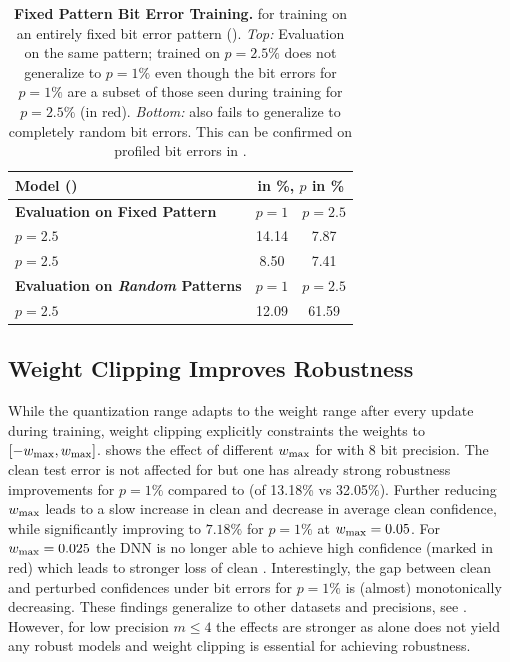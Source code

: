 \begin{table}[t]
	\centering
	\caption{\textbf{Fixed Pattern Bit Error Training.} \RTE for training on an entirely fixed bit error pattern (\Pattern). \emph{Top:} Evaluation on the same pattern; \Pattern trained on $p = 2.5\%$ does not generalize to $p = 1\%$ even though the bit errors for $p = 1\%$ are a subset of those seen during training for $p = 2.5\%$ (in {\color{colorbrewer1}red}). \emph{Bottom:} \Pattern also fails to generalize to completely random bit errors. This can be confirmed on profiled bit errors in .}
	\label{tab:randbet-baselines}
	\vspace*{-0.25cm}
	\small
	\begin{tabular}{| l | c | c |}
		\hline
		Model (\CifarT) & \multicolumn{2}{c|}{\RTE in \%, $p$ in \%}\\
		\hline
		\hline
		\textbf{Evaluation on Fixed Pattern} & $p{=}1$ & $p{=}2.5$\\
		\hline
		\Pattern $p{=}2.5$ & {\color{colorbrewer1}14.14} & 7.87\\
		\Pattern[$0.15$] $p{=}2.5$ & {\color{colorbrewer1}8.50} & 7.41\\
		\hline\hline
		\textbf{Evaluation on \emph{Random} Patterns} & $p{=}1$ & $p{=}2.5$\\
		\hline
		\Pattern[$0.15$] $p{=}2.5$ & 12.09 & 61.59\\
		\hline
	\end{tabular}
	\vspace*{-0.2cm}
\end{table}

\subsection{Weight Clipping Improves Robustness}
\label{subsec:experiments-clipping}
While the quantization range adapts to the weight range
after every update during training, weight clipping explicitly constraints the weights to $[-\wmax, \wmax]$.
 shows the effect of
different $\wmax$ for \CifarT with 8 bit precision. The clean test error is not affected for \Clipping[$\mathbf{\wmax{=}0.15}$] but
one has already strong robustness improvements for $p=1\%$
compared to \Quant (\RTE of 13.18\% vs 32.05\%). Further reducing $\wmax$ leads to a slow increase in clean \TE and decrease in average clean confidence, while significantly
improving \RTE to $7.18\%$ for $p=1\%$ at $\wmax=0.05$. For $\wmax=0.025$
the DNN is no longer able to achieve high confidence (marked in {\color{colorbrewer1}red}) which leads to stronger loss of clean \TE. Interestingly, the gap between clean and perturbed confidences under bit errors for $p=1\%$ is (almost) monotonically decreasing. These findings generalize to other datasets and precisions, see . However, for low precision $m\leq 4$ the effects are stronger 
as \Quant alone does not yield any robust models and weight clipping is essential for achieving robustness. 

